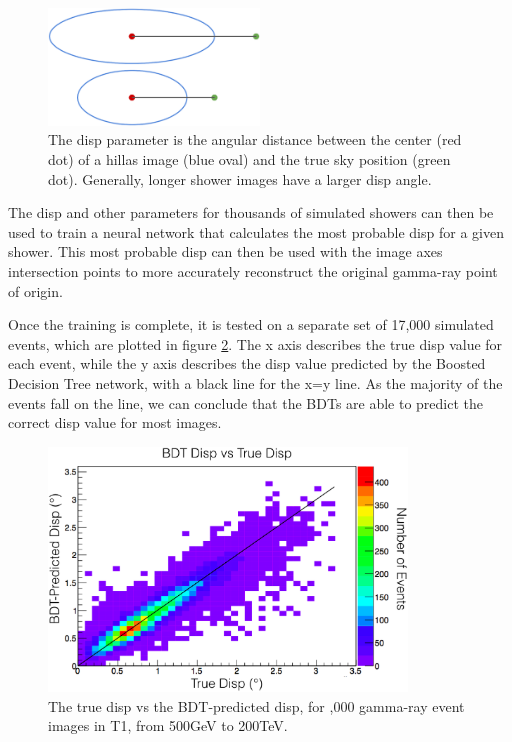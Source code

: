 \begin{figure}[ht]
  \begin{center}
    \includegraphics[width=0.5\textwidth]{images/disp_diagram.eps}
    \caption[Angular Reconstruction Disp]{The disp parameter is the angular distance between the center (red dot) of a hillas image (blue oval) and the true sky position (green dot).  Generally, longer shower images have a larger disp angle.}\label{fig:dispdiagram}
  \end{center}
\end{figure}

The disp and other parameters for thousands of simulated showers can then be used to train a neural network that calculates the most probable disp for a given shower.
This most probable disp can then be used with the image axes intersection points to more accurately reconstruct the original gamma-ray point of origin.

Once the training is complete, it is tested on a separate set of 17,000 simulated events, which are plotted in figure \ref{fig:disptraining}.
The x axis describes the true disp value for each event, while the y axis describes the disp value predicted by the Boosted Decision Tree network, with a black line for the x=y line.
As the majority of the events fall on the line, we can conclude that the BDTs are able to predict the correct disp value for most images.

\begin{figure}[ht]
  \begin{center}
    \includegraphics[width=0.85\textwidth]{images/disp_training.eps}
    \caption[Disp BDT Training]{The true disp vs the BDT-predicted disp, for ,000 gamma-ray event images in T1, from 500GeV to 200TeV.}\label{fig:disptraining}
  \end{center}
\end{figure}

